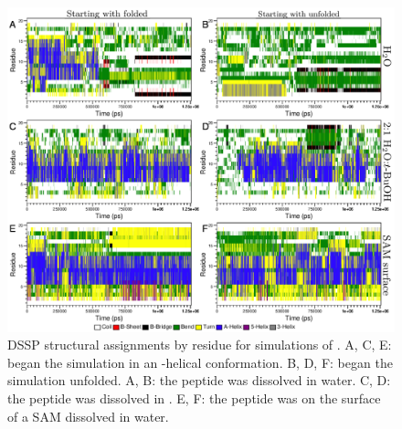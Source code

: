 \begin{figure}
    \center
    \includegraphics[width=6.0in]{figures-helix/dssp.png}
    \caption{
        DSSP structural assignments by residue for simulations of \pep{}. 
        A, C, E: \pep{} began the simulation in an \textalpha{}-helical conformation. 
        B, D, F: \pep{} began the simulation unfolded.
        A, B: the peptide was dissolved in water. 
        C, D: the peptide was dissolved in \tbawat{}. 
        E, F: the peptide was on the surface of a SAM dissolved in water.
    }
    \label{fig:helix-dssp}
\end{figure}

